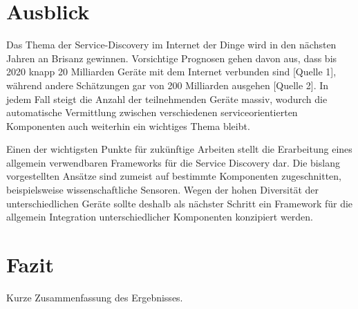 \documentclass[conference,compsoc]{IEEEtran}
\begin{document}
\section{Ausblick}

Das Thema der Service-Discovery im Internet der Dinge wird in den nächsten Jahren an Brisanz gewinnen. Vorsichtige Prognosen gehen davon aus, dass bis 2020 knapp 20 Milliarden Geräte mit dem Internet verbunden sind [Quelle 1], während andere Schätzungen gar von 200 Milliarden ausgehen [Quelle 2]. In jedem Fall steigt die Anzahl der teilnehmenden Geräte massiv, wodurch die automatische Vermittlung zwischen verschiedenen serviceorientierten Komponenten auch weiterhin ein wichtiges Thema bleibt.

Einen der wichtigsten Punkte für zukünftige Arbeiten stellt die Erarbeitung eines allgemein verwendbaren Frameworks für die Service Discovery dar. Die bislang vorgestellten Ansätze sind zumeist auf bestimmte Komponenten zugeschnitten, beispielsweise wissenschaftliche Sensoren. Wegen der hohen Diversität der unterschiedlichen Geräte sollte deshalb als nächster Schritt ein Framework für die allgemein Integration unterschiedlicher Komponenten konzipiert werden.



\section{Fazit}
Kurze Zusammenfassung des Ergebnisses.


%
%
\end{document}
